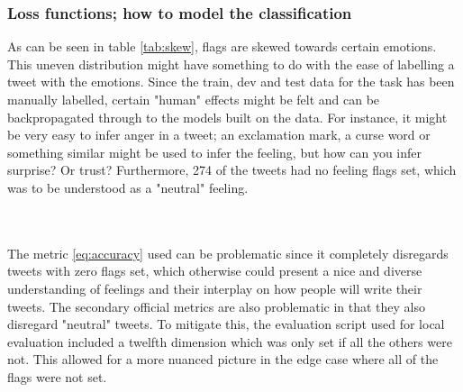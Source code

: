\subsubsection{Loss functions; how to model the classification} \label{sec:lossdiscussion}
As can be seen in table \ref{tab:skew}, flags are skewed towards certain emotions. This uneven distribution might have something to do with the ease of labelling a tweet with the emotions. Since the train, dev and test data for the task has been manually labelled, certain "human" effects might be felt and can be backpropagated through to the models built on the data. For instance, it might be very easy to infer anger in a tweet; an exclamation mark, a curse word or something similar might be used to infer the feeling, but how can you infer surprise? Or trust? Furthermore, 274 of the tweets had no feeling flags set, which was to be understood as a "neutral" feeling.\\
\begin{table}[h]
\caption{The actual flags set and percentage of the full classification dataset}
\label{tab:skew}
\end{table}\\
\\
The metric \ref{eq:accuracy} used can be problematic since it completely disregards tweets with zero flags set, which otherwise could present a nice and diverse understanding of feelings and their interplay on how people will write their tweets. The secondary official metrics are also problematic in that they also disregard "neutral" tweets. To mitigate this, the evaluation script used for local evaluation included a twelfth dimension which was only set if all the others were not. This allowed for a more nuanced picture in the edge case where all of the flags were not set.

